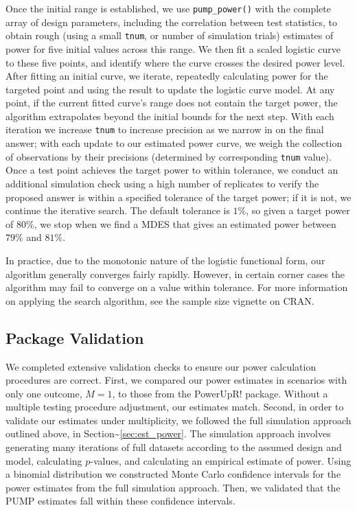 \documentclass[
]{article}
\begin{document}
Once the initial range is established, we use \texttt{pump\_power()}
with the complete array of design parameters, including the correlation
between test statistics, to obtain rough (using a small \texttt{tnum},
or number of simulation trials) estimates of power for five initial
values across this range. We then fit a scaled logistic curve to these
five points, and identify where the curve crosses the desired power
level. After fitting an initial curve, we iterate, repeatedly
calculating power for the targeted point and using the result to update
the logistic curve model. At any point, if the current fitted curve's
range does not contain the target power, the algorithm extrapolates
beyond the initial bounds for the next step. With each iteration we
increase \texttt{tnum} to increase precision as we narrow in on the
final answer; with each update to our estimated power curve, we weigh
the collection of observations by their precisions (determined by
corresponding \texttt{tnum} value). Once a test point achieves the
target power to within tolerance, we conduct an additional simulation
check using a high number of replicates to verify the proposed answer is
within a specified tolerance of the target power; if it is not, we
continue the iterative search. The default tolerance is \(1\%\), so
given a target power of \(80\%\), we stop when we find a MDES that gives
an estimated power between \(79\%\) and \(81\%\).

In practice, due to the monotonic nature of the logistic functional
form, our algorithm generally converges fairly rapidly. However, in
certain corner cases the algorithm may fail to converge on a value
within tolerance. For more information on applying the search algorithm,
see the sample size vignette on CRAN.

\subsection{Package Validation}

We completed extensive validation checks to ensure our power calculation
procedures are correct. First, we compared our power estimates in
scenarios with only one outcome, \(M = 1\), to those from the PowerUpR!
package. Without a multiple testing procedure adjustment, our estimates
match. Second, in order to validate our estimates under multiplicity, we
followed the full simulation approach outlined above, in
Section\textasciitilde{}\ref{sec:est_power}. The simulation approach
involves generating many iterations of full datasets according to the
assumed design and model, calculating \(p\)-values, and calculating an
empirical estimate of power. Using a binomial distribution we
constructed Monte Carlo confidence intervals for the power estimates
from the full simulation approach. Then, we validated that the PUMP
estimates fall within these confidence intervals.
\end{document}
